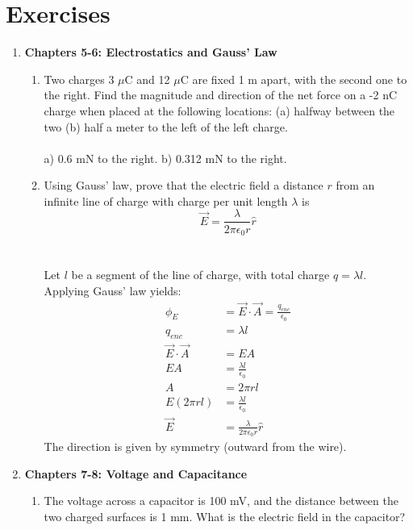 \documentclass[10pt]{article}
\begin{document}
\clearpage

\section{Exercises}

\begin{enumerate}
\item \textbf{Chapters 5-6: Electrostatics and Gauss' Law}
\begin{enumerate}
\item Two charges 3 $\mu$C and 12 $\mu$C are fixed 1 m apart, with the second one to the right. Find the magnitude and direction of the net force on a -2 nC charge when placed at the following locations: (a) halfway between the two (b) half a meter to the left of the left charge. \\ \\
a) 0.6 mN to the right.  b) 0.312 mN to the right. \\
\item Using Gauss' law, prove that the electric field a distance $r$ from an infinite line of charge with charge per unit length $\lambda$ is
\begin{equation}
\vec{E} = \frac{\lambda}{2\pi\epsilon_0 r} \hat{r}
\end{equation} \\ \\
Let $l$ be a segment of the line of charge, with total charge $q = \lambda l$. Applying Gauss' law yields:
\begin{align}
\phi_E &= \vec{E} \cdot \vec{A} = \frac{q_{enc}}{\epsilon_0} \\
q_{enc} &= \lambda l \\
\vec{E} \cdot \vec{A} &= EA \\
EA &= \frac{\lambda l}{\epsilon_0} \\
A &= 2\pi r l \\
E(2\pi r l) &= \frac{\lambda l}{\epsilon_0} \\
\vec{E} &= \frac{\lambda}{2\pi\epsilon_0 r} \hat{r}
\end{align}
The direction is given by symmetry (outward from the wire).
\end{enumerate}
\item \textbf{Chapters 7-8: Voltage and Capacitance}
\begin{enumerate}
\item The voltage across a capacitor is 100 mV, and the distance between the two charged surfaces is 1 mm.  What is the electric field in the capacitor? \\ \\

\end{enumerate}
\end{enumerate}
\end{document}
